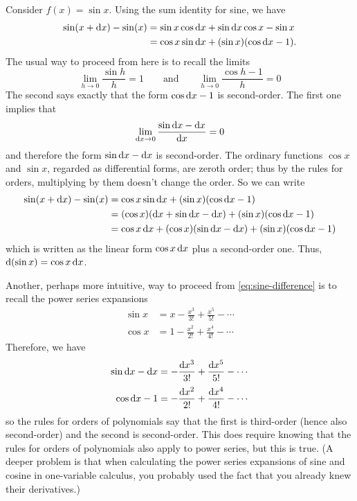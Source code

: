 \documentclass[12pt]{amsart}
\begin{document}
\begin{eg}
  Consider $f(x) = \sin x$.
  Using the sum identity for sine, we have
  \begin{align}
    \sin(x+\mathrm{d} x) - \sin (x)
    &= \sin x \cos \mathrm{d} x + \sin \mathrm{d} x \cos x - \sin x \notag\\
    &= \cos x \sin \mathrm{d} x + (\sin x) (\cos \mathrm{d} x - 1).\label{eq:sine-difference}
  \end{align}
  The usual way to proceed from here is to recall the limits
  \[ \lim_{h\to 0} \frac{\sin h}{h} = 1 \qquad\text{and}\qquad
  \lim_{h\to 0} \frac{\cos h - 1}{h} = 0 \]
  The second says exactly that the form $\cos \mathrm{d} x - 1$ is second-order.
  The first one implies that
  \[ \lim_{\mathrm{d} x\to 0} \frac{\sin \mathrm{d} x - \mathrm{d} x}{\mathrm{d} x} = 0 \]
  and therefore the form $\sin \mathrm{d} x - \mathrm{d} x$ is second-order.
  The ordinary functions $\cos x$ and $\sin x$, regarded as differential forms, are zeroth order; thus by the rules for orders, multiplying by them doesn't change the order.
  So we can write
  \begin{align*}
    \sin(x+\mathrm{d} x) - \sin (x)
    &= \cos x \sin \mathrm{d} x + (\sin x) (\cos \mathrm{d} x - 1)\\
    &= (\cos x )(\mathrm{d} x  + \sin \mathrm{d} x - \mathrm{d} x) + (\sin x) (\cos \mathrm{d} x - 1)\\
    &= \cos x \,\mathrm{d} x + (\cos x) (\sin \mathrm{d} x - \mathrm{d} x) + (\sin x) (\cos \mathrm{d} x - 1)
  \end{align*}
  which is written as the linear form $\cos x \,\mathrm{d} x$ plus a second-order one.
  Thus, $\mathrm{d}(\sin x) = \cos x \,\mathrm{d} x$.

  Another, perhaps more intuitive, way to proceed from \cref{eq:sine-difference} is to recall the power series expansions
  \begin{align*}
    \sin x &= x - \frac{x^3}{3!} + \frac{x^5}{5!} - \cdots\\[2pt]
    \cos x &= 1 - \frac{x^2}{2!} + \frac{x^4}{4!} - \cdots
  \end{align*}
  Therefore, we have
  \begin{align*}
    \sin \mathrm{d} x - \mathrm{d} x &= - \frac{\mathrm{d} x^3}{3!} + \frac{\mathrm{d} x^5}{5!} - \cdots\\[2pt]
    \cos \mathrm{d} x - 1 &= - \frac{\mathrm{d} x^2}{2!} + \frac{\mathrm{d} x^4}{4!} - \cdots
  \end{align*}
  so the rules for orders of polynomials say that the first is third-order (hence also second-order) and the second is second-order.
  This does require knowing that the rules for orders of polynomials also apply to power series, but this is true.
  (A deeper problem is that when calculating the power series expansions of sine and cosine in one-variable calculus, you probably used the fact that you already knew their derivatives.)
\end{eg}
\end{document}
